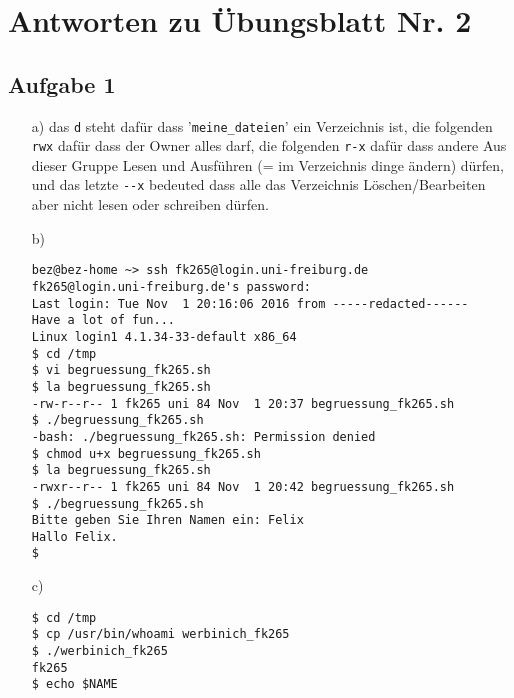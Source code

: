 \documentclass{scrartcl}
\begin{document}
\section*{Antworten zu Übungsblatt Nr. 2}

\subsection*{Aufgabe 1}
\begin{itemize}
  \item[a)] das \verb$d$ steht dafür dass '\verb$meine_dateien$' ein Verzeichnis ist,
    die folgenden \verb$rwx$ dafür dass der Owner alles darf, die folgenden \verb!r-x! dafür dass
    andere Aus dieser Gruppe Lesen und Ausführen (= im Verzeichnis dinge ändern) dürfen,
    und das letzte \verb$--x$ bedeuted dass alle das Verzeichnis Löschen/Bearbeiten
    aber nicht lesen oder schreiben dürfen.
  \item[b)]
\begin{verbatim}
bez@bez-home ~> ssh fk265@login.uni-freiburg.de
fk265@login.uni-freiburg.de's password:
Last login: Tue Nov  1 20:16:06 2016 from -----redacted------
Have a lot of fun...
Linux login1 4.1.34-33-default x86_64
$ cd /tmp
$ vi begruessung_fk265.sh
$ la begruessung_fk265.sh
-rw-r--r-- 1 fk265 uni 84 Nov  1 20:37 begruessung_fk265.sh
$ ./begruessung_fk265.sh
-bash: ./begruessung_fk265.sh: Permission denied
$ chmod u+x begruessung_fk265.sh
$ la begruessung_fk265.sh
-rwxr--r-- 1 fk265 uni 84 Nov  1 20:42 begruessung_fk265.sh
$ ./begruessung_fk265.sh
Bitte geben Sie Ihren Namen ein: Felix
Hallo Felix.
$
\end{verbatim}
  \item[c)]
\begin{verbatim}
$ cd /tmp
$ cp /usr/bin/whoami werbinich_fk265
$ ./werbinich_fk265
fk265
$ echo $NAME


\end{verbatim}
\end{itemize}
\end{document}
